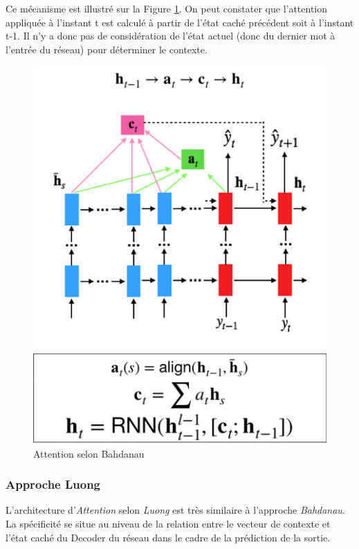\noindent Ce mécanisme est illustré sur la Figure \ref{bahdanau}. On peut constater que l'attention appliquée à l'instant t est calculé à partir de l'état caché précédent soit à l'instant t-1. Il n'y a donc pas de considération de l'état actuel (donc du dernier mot à l'entrée du réseau) pour déterminer le contexte.

\begin{figure}
    \centering
    \includegraphics[scale=0.4]{./tex/attention-deep-learning/badhanaupic.png}
    \caption{Attention selon Bahdanau}
    \label{bahdanau}
\end{figure}

\subsubsection{Approche Luong}

\noindent L'architecture d'\textit{Attention} selon \textit{Luong}\cite{softluong} est très similaire à l'approche \textit{Bahdanau}. La spécificité se situe au niveau de la relation entre le vecteur de contexte et l'état caché du Decoder du réseau dans le cadre de la prédiction de la sortie.\\


